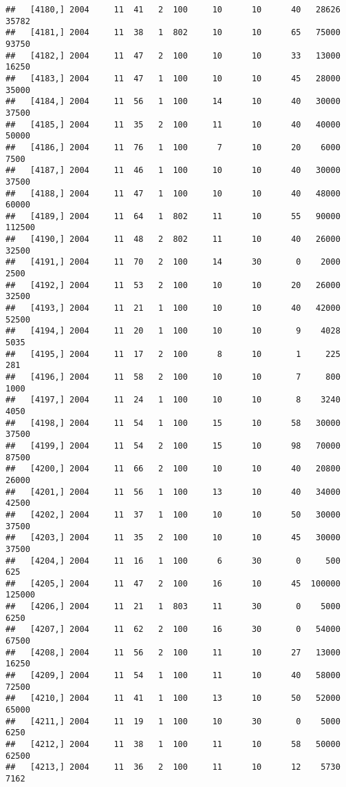 \documentclass{article}\usepackage[]{graphicx}\usepackage[]{color}
\makeatletter
\newenvironment{kframe}{%
 \def\at@end@of@kframe{}%
 \ifinner\ifhmode%
  \def\at@end@of@kframe{\end{minipage}}%
  \begin{minipage}{\columnwidth}%
 \fi\fi%
 \def\FrameCommand##1{\hskip\@totalleftmargin \hskip-\fboxsep
 \colorbox{shadecolor}{##1}\hskip-\fboxsep
     \hskip-\linewidth \hskip-\@totalleftmargin \hskip\columnwidth}%
 \MakeFramed {\advance\hsize-\width
   \@totalleftmargin\z@ \linewidth\hsize
   \@setminipage}}%
 {\par\unskip\endMakeFramed%
 \at@end@of@kframe}
\newenvironment{knitrout}{}{} %
\makeatother
\begin{document}
\begin{knitrout}
\begin{kframe}
\begin{verbatim}
##   [4180,] 2004     11  41   2  100     10      10      40   28626   35782
##   [4181,] 2004     11  38   1  802     10      10      65   75000   93750
##   [4182,] 2004     11  47   2  100     10      10      33   13000   16250
##   [4183,] 2004     11  47   1  100     10      10      45   28000   35000
##   [4184,] 2004     11  56   1  100     14      10      40   30000   37500
##   [4185,] 2004     11  35   2  100     11      10      40   40000   50000
##   [4186,] 2004     11  76   1  100      7      10      20    6000    7500
##   [4187,] 2004     11  46   1  100     10      10      40   30000   37500
##   [4188,] 2004     11  47   1  100     10      10      40   48000   60000
##   [4189,] 2004     11  64   1  802     11      10      55   90000  112500
##   [4190,] 2004     11  48   2  802     11      10      40   26000   32500
##   [4191,] 2004     11  70   2  100     14      30       0    2000    2500
##   [4192,] 2004     11  53   2  100     10      10      20   26000   32500
##   [4193,] 2004     11  21   1  100     10      10      40   42000   52500
##   [4194,] 2004     11  20   1  100     10      10       9    4028    5035
##   [4195,] 2004     11  17   2  100      8      10       1     225     281
##   [4196,] 2004     11  58   2  100     10      10       7     800    1000
##   [4197,] 2004     11  24   1  100     10      10       8    3240    4050
##   [4198,] 2004     11  54   1  100     15      10      58   30000   37500
##   [4199,] 2004     11  54   2  100     15      10      98   70000   87500
##   [4200,] 2004     11  66   2  100     10      10      40   20800   26000
##   [4201,] 2004     11  56   1  100     13      10      40   34000   42500
##   [4202,] 2004     11  37   1  100     10      10      50   30000   37500
##   [4203,] 2004     11  35   2  100     10      10      45   30000   37500
##   [4204,] 2004     11  16   1  100      6      30       0     500     625
##   [4205,] 2004     11  47   2  100     16      10      45  100000  125000
##   [4206,] 2004     11  21   1  803     11      30       0    5000    6250
##   [4207,] 2004     11  62   2  100     16      30       0   54000   67500
##   [4208,] 2004     11  56   2  100     11      10      27   13000   16250
##   [4209,] 2004     11  54   1  100     11      10      40   58000   72500
##   [4210,] 2004     11  41   1  100     13      10      50   52000   65000
##   [4211,] 2004     11  19   1  100     10      30       0    5000    6250
##   [4212,] 2004     11  38   1  100     11      10      58   50000   62500
##   [4213,] 2004     11  36   2  100     11      10      12    5730    7162

\end{verbatim}
\end{kframe}
\end{knitrout}
\end{document}
